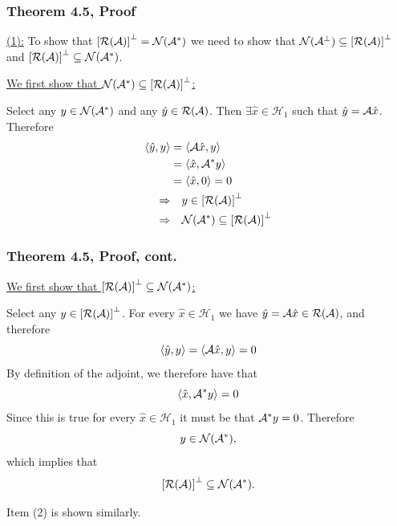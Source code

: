 \documentclass{beamer}
\begin{document}
\begin{frame}\frametitle{Theorem 4.5, Proof}
	\underline{(1):}  To show that $\left[ \mathcal{R}(\mathcal{A}) \right]^{\perp} = \mathcal{N}(\mathcal{A}^\ast)$ we need to show that $\mathcal{N}(\mathcal{A}^{\perp}) \subseteq \left[\mathcal{R}(\mathcal{A})\right]^{\perp}$ and $\left[ \mathcal{R}(\mathcal{A})\right]^{\perp} \subseteq \mathcal{N}(\mathcal{A}^\ast)$.
	
	\vfill
	
	\underline{We first show that $\mathcal{N}(\mathcal{A}^\ast) \subseteq \left[\mathcal{R}(\mathcal{A})\right]^{\perp}$:}
	
	\vfill
	
	Select any $y \in \mathcal{N}(\mathcal{A}^\ast)$ and any $\hat{y} \in \mathcal{R}(\mathcal{A})$.  
	Then $\exists \hat{x} \in \mathcal{H}_1$ such that $\hat{y} = \mathcal{A}\hat{x}$.  Therefore
	\begin{align*}
		\left<\hat{y}, y \right> &= \left<\mathcal{A}\hat{x},y \right> \\
			&= \left<\hat{x}, \mathcal{A}^\ast y \right>\\
			&= \left<\hat{x}, 0 \right> = 0 \\
		\Rightarrow &\quad y \in \left[ \mathcal{R}(\mathcal{A}) \right]^{\perp} \\
		\Rightarrow &\quad \mathcal{N}(\mathcal{A}^\ast) \subseteq \left[\mathcal{R}(\mathcal{A})\right]^{\perp}
	\end{align*}
\end{frame}

\begin{frame}\frametitle{Theorem 4.5, Proof, cont.}

	\underline{We first show that $\left[ \mathcal{R}(\mathcal{A})\right]^{\perp} \subseteq \mathcal{N}(\mathcal{A}^\ast)$:}
	
	\vfill
	
	Select any $y \in \left[ \mathcal{R}(\mathcal{A})\right]^{\perp}$.  For every $\hat{x} \in \mathcal{H}_1$ we have $\hat{y} = \mathcal{A}\hat{x}\in\mathcal{R}(\mathcal{A})$, and therefore
	\[ \left<\hat{y},y \right>= \left<\mathcal{A}\hat{x},y \right> = 0 \]
	By definition of the adjoint, we therefore have that
	\[ \left<\hat{x}, \mathcal{A}^\ast y \right> = 0 \]
	Since this is true for every $\hat{x} \in \mathcal{H}_1$ it must be that $\mathcal{A}^\ast y = 0$.  Therefore
	\[ y \in \mathcal{N}(\mathcal{A}^\ast), \]	
	which implies that
	\[\left[ \mathcal{R}(\mathcal{A})\right]^{\perp} \subseteq \mathcal{N}(\mathcal{A}^\ast).\]
	
	\vfill
	
	Item (2) is shown similarly.
\end{frame}
\end{document}
